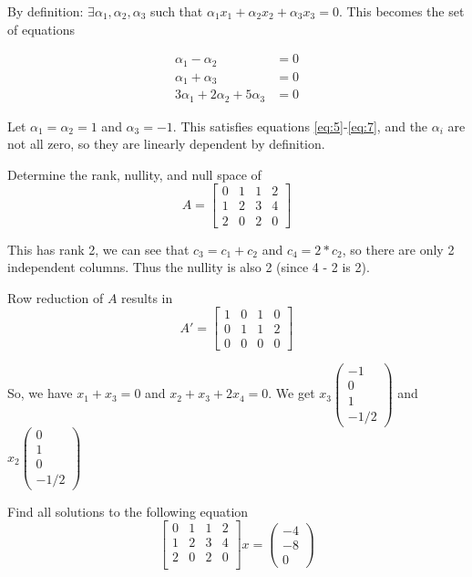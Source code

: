\documentclass[11pt]{article}
\begin{document}
\soln

By definition:
$\exists \alpha_1, \alpha_2, \alpha_3$ such that $\alpha_1 x_1 + \alpha_2 x_2 + \alpha_3 x_3 = 0$.
This becomes the set of equations 

\begin{align}
    \alpha_1 - \alpha_2 &= 0 \label{eq:5}\\
    \alpha_1 + \alpha_3 &= 0\\
    3\alpha_1 + 2\alpha_2 + 5\alpha_3 &= 0 \label{eq:7}
\end{align}

Let $\alpha_1 = \alpha_2 = 1$ and $\alpha_3 = -1$.
This satisfies equations \ref{eq:5}-\ref{eq:7}, and the $\alpha_i$ are not all zero, so they are linearly dependent by definition.


Determine the rank, nullity, and null space of 
$$
A = \begin{bmatrix}
    0 & 1 & 1 & 2 \\
    1 & 2 & 3 & 4 \\
    2 & 0 & 2 & 0
\end{bmatrix}
$$

\soln

This has rank 2, we can see that $c_3 = c_1 + c_2$ and $c_4 = 2*c_2$, so there are only 2 independent columns.
Thus the nullity is also 2 (since 4 - 2 is 2).

Row reduction of $A$ results in 
$$
A' = \begin{bmatrix}
    1 & 0 & 1 & 0 \\
    0 & 1 & 1 & 2 \\
    0 & 0 & 0 & 0
\end{bmatrix}
$$

So, we have $x_1 + x_3 = 0$ and $x_2 + x_3 + 2x_4 = 0$. 
We get $x_3 \begin{pmatrix}
    -1 \\ 0 \\ 1 \\ -1/2
\end{pmatrix}$ and $x_2 \begin{pmatrix}
    0 \\ 1 \\ 0 \\ -1/2
\end{pmatrix}$

Find all solutions to the following equation
$$
\begin{bmatrix}
    0 & 1 & 1 & 2\\
    1 & 2 & 3 & 4\\
    2 & 0 & 2 & 0\\
\end{bmatrix} x = \begin{pmatrix}
    -4 \\ -8 \\ 0
\end{pmatrix}
$$
\end{document}
